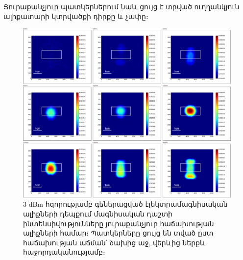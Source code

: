\documentclass[12pt, fleqn]{report}
\begin{document}
\newpage
Յուրաքանչյուր պատկերներում նաև ցույց է տրված ուղղանկյուն ալիքատարի կտրվածքի դիրքը և չափը։
\begin{figure}
    \begin{adjustwidth}{-1.5cm}{}
    \centering
     \includegraphics[width=1.0\textwidth]{data/experiment-results/free field of antenna, 6-14ghz, 3dbm generator output, distance 5mm.png}
    \caption{3 dBm հզորությամբ գեներացված էլեկտրամագնիսական ալիքների դեպքում մագնիսական դաշտի ինտենսիվությունները յուրաքանչյուր հաճախության ալիքների համար։ Պատկերները ցույց են տված ըստ հաճախության աճման՝ ձախից աջ, վերևից ներքև հաջորդականությամբ։}
    \label{fig:3dBm-diagram}
\end{adjustwidth}
\end{figure}
\end{document}
